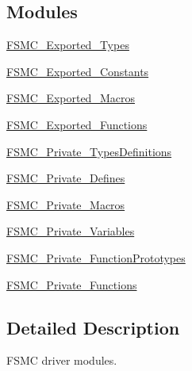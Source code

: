 \subsection*{Modules}
\begin{DoxyCompactItemize}
\item 
\hyperlink{group___f_s_m_c___exported___types}{F\+S\+M\+C\+\_\+\+Exported\+\_\+\+Types}
\item 
\hyperlink{group___f_s_m_c___exported___constants}{F\+S\+M\+C\+\_\+\+Exported\+\_\+\+Constants}
\item 
\hyperlink{group___f_s_m_c___exported___macros}{F\+S\+M\+C\+\_\+\+Exported\+\_\+\+Macros}
\item 
\hyperlink{group___f_s_m_c___exported___functions}{F\+S\+M\+C\+\_\+\+Exported\+\_\+\+Functions}
\item 
\hyperlink{group___f_s_m_c___private___types_definitions}{F\+S\+M\+C\+\_\+\+Private\+\_\+\+Types\+Definitions}
\item 
\hyperlink{group___f_s_m_c___private___defines}{F\+S\+M\+C\+\_\+\+Private\+\_\+\+Defines}
\item 
\hyperlink{group___f_s_m_c___private___macros}{F\+S\+M\+C\+\_\+\+Private\+\_\+\+Macros}
\item 
\hyperlink{group___f_s_m_c___private___variables}{F\+S\+M\+C\+\_\+\+Private\+\_\+\+Variables}
\item 
\hyperlink{group___f_s_m_c___private___function_prototypes}{F\+S\+M\+C\+\_\+\+Private\+\_\+\+Function\+Prototypes}
\item 
\hyperlink{group___f_s_m_c___private___functions}{F\+S\+M\+C\+\_\+\+Private\+\_\+\+Functions}
\end{DoxyCompactItemize}


\subsection{Detailed Description}
F\+S\+MC driver modules. 

